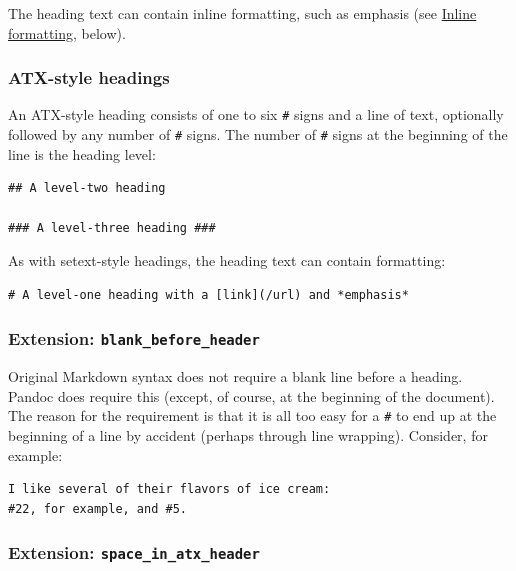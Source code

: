 \documentclass[
]{article}
\begin{document}
The heading text can contain inline formatting, such as emphasis (see
\protect\hyperlink{inline-formatting}{Inline formatting}, below).

\hypertarget{atx-style-headings}{%
\subsubsection{ATX-style headings}\label{atx-style-headings}}

An ATX-style heading consists of one to six \texttt{\#} signs and a line
of text, optionally followed by any number of \texttt{\#} signs. The
number of \texttt{\#} signs at the beginning of the line is the heading
level:

\begin{verbatim}
## A level-two heading

### A level-three heading ###
\end{verbatim}

As with setext-style headings, the heading text can contain formatting:

\begin{verbatim}
# A level-one heading with a [link](/url) and *emphasis*
\end{verbatim}

\hypertarget{extension-blank_before_header}{%
\subsubsection{\texorpdfstring{Extension:
\texttt{blank\_before\_header}}{Extension: blank\_before\_header}}\label{extension-blank_before_header}}

Original Markdown syntax does not require a blank line before a heading.
Pandoc does require this (except, of course, at the beginning of the
document). The reason for the requirement is that it is all too easy for
a \texttt{\#} to end up at the beginning of a line by accident (perhaps
through line wrapping). Consider, for example:

\begin{verbatim}
I like several of their flavors of ice cream:
#22, for example, and #5.
\end{verbatim}

\hypertarget{extension-space_in_atx_header}{%
\subsubsection{\texorpdfstring{Extension:
\texttt{space\_in\_atx\_header}}{Extension: space\_in\_atx\_header}}\label{extension-space_in_atx_header}}
\end{document}
